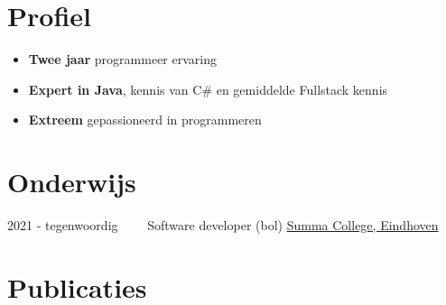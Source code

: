 \documentclass[letterpaper]{twentysecondcv} %
\begin{document}
\makesidebarFirst %

\section{Profiel}

\begin{itemize}
	\item \textbf{Twee jaar} programmeer ervaring
	\item \textbf{Expert in Java}, kennis van C\# en gemiddelde Fullstack kennis
	\item \textbf{Extreem} gepassioneerd in programmeren
\end{itemize}

\vspace{6mm}


\section{Onderwijs}

\begin{twenty} %
	\twentyitem
    	{2021 - tegenwoordig~~~~}
        {}
        {Software developer (bol)}
        {\href{https://www.summacollege.nl/}{Summa College, Eindhoven}}
        {}
        {}
\end{twenty}



\section{Publicaties}
\begin{twenty} %
\end{twenty}

\end{document}
